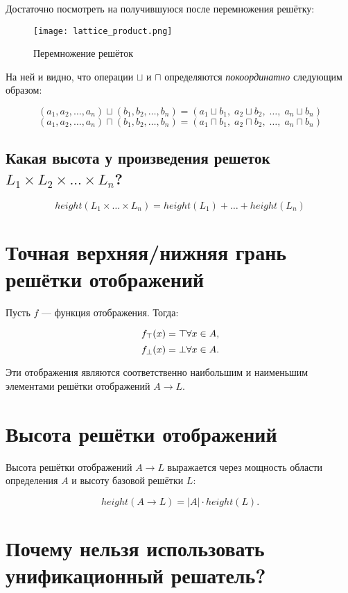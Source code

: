 \documentclass{report}
\begin{document}
Достаточно посмотреть на получившуюся после перемножения решётку:

\begin{figure}[h]
    \centering
    \texttt{[image: lattice\_product.png]}
    \caption{Перемножение решёток}
    \label{fig:latproduct}
\end{figure}

На ней и видно, что операции $\sqcup$ и $\sqcap$ определяются \textit{покоординатно} следующим образом:

$$
(a_1, a_2, \dots, a_n) \sqcup (b_1, b_2, \dots, b_n) = (a_1 \sqcup b_1,\; a_2 \sqcup b_2,\; \dots,\; a_n \sqcup b_n)
$$
$$
(a_1, a_2, \dots, a_n) \sqcap (b_1, b_2, \dots, b_n) = (a_1 \sqcap b_1,\; a_2 \sqcap b_2,\; \dots,\; a_n \sqcap b_n)
$$

\subsection{Какая высота у произведения решеток $L_1 \times L_2 \times . . . \times L_n$?}

\[
{height}(L_1 \times \dots \times L_n) =
{height}(L_1) + \dots + {height}(L_n)
\]

\section{Точная верхняя/нижняя грань решётки отображений}

Пусть $ f $ — функция отображения. Тогда:

$$
f_\top(x) = \top \space \forall x \in A,
$$
$$
f_\bot(x) = \bot \space \forall x \in A.
$$

Эти отображения являются соответственно наибольшим и наименьшим элементами решётки отображений $ A \to L $.

\section{Высота решётки отображений}

Высота решётки отображений $ A \to L $ выражается через мощность области определения $ A $ и высоту базовой решётки $ L $:

$$
{height}(A \to L) = |A| \cdot{height}(L).
$$

\section{Почему нельзя использовать унификационный решатель?}
\end{document}
